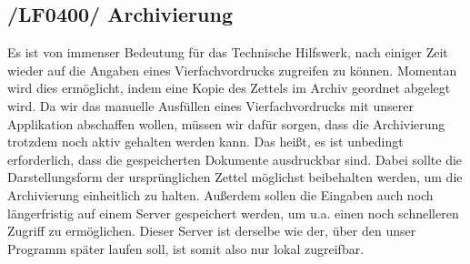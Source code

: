 \subsection{/LF0400/ Archivierung}
Es ist von immenser Bedeutung für das Technische Hilfswerk, nach einiger Zeit wieder auf die Angaben eines Vierfachvordrucks
zugreifen zu können. Momentan wird dies ermöglicht, indem eine Kopie des Zettels im Archiv geordnet abgelegt wird. Da wir das manuelle Ausfüllen eines Vierfachvordrucks mit unserer Applikation abschaffen wollen, müssen wir dafür sorgen, dass die Archivierung trotzdem noch aktiv gehalten werden kann. Das heißt, es ist unbedingt erforderlich, dass die gespeicherten Dokumente ausdruckbar sind. Dabei sollte die Darstellungsform der ursprünglichen Zettel möglichst beibehalten werden, um die Archivierung einheitlich zu halten. Außerdem sollen die Eingaben auch noch längerfristig auf einem Server gespeichert werden, um u.a. einen noch schnelleren Zugriff zu ermöglichen. Dieser Server ist derselbe wie der, über den unser Programm später laufen soll, ist somit also nur lokal zugreifbar.